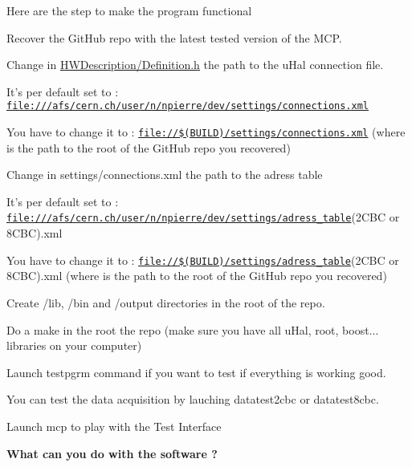 Here are the step to make the program functional


\begin{DoxyEnumerate}
\item Recover the Git\-Hub repo with the latest tested version of the M\-C\-P.
\item Change in \hyperlink{_definition_8h}{H\-W\-Description/\-Definition.\-h} the path to the u\-Hal connection file.
\begin{DoxyItemize}
\item It's per default set to \-: \href{file:///afs/cern.ch/user/n/npierre/dev/settings/connections.xml}{\tt file\-:///afs/cern.\-ch/user/n/npierre/dev/settings/connections.\-xml}
\item You have to change it to \-: \href{file://$(BUILD)/settings/connections.xml}{\tt file\-://\$(\-B\-U\-I\-L\-D)/settings/connections.\-xml} (where  is the path to the root of the Git\-Hub repo you recovered)
\end{DoxyItemize}
\item Change in settings/connections.\-xml the path to the adress table
\begin{DoxyItemize}
\item It's per default set to \-: \href{file:///afs/cern.ch/user/n/npierre/dev/settings/adress_table}{\tt file\-:///afs/cern.\-ch/user/n/npierre/dev/settings/adress\-\_\-table}(2\-C\-B\-C or 8\-C\-B\-C).xml
\item You have to change it to \-: \href{file://$(BUILD)/settings/adress_table}{\tt file\-://\$(\-B\-U\-I\-L\-D)/settings/adress\-\_\-table}(2\-C\-B\-C or 8\-C\-B\-C).xml (where  is the path to the root of the Git\-Hub repo you recovered)
\end{DoxyItemize}
\item Create /lib, /bin and /output directories in the root of the repo.
\item Do a make in the root the repo (make sure you have all u\-Hal, root, boost... libraries on your computer)
\item Launch testpgrm command if you want to test if everything is working good.
\item You can test the data acquisition by lauching datatest2cbc or datatest8cbc.
\item Launch mcp to play with the Test Interface \par
 \par
 {\bfseries What can you do with the software ?}
\end{DoxyEnumerate}

